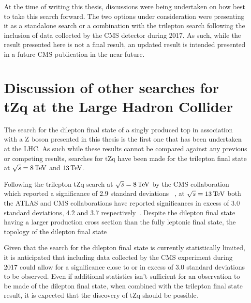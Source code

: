 At the time of writing this thesis, discussions were being undertaken on how best to take this search forward.
The two options under consideration were presenting it as a standalone search or a combination with the trilepton search following the inclusion of data collected by the CMS detector during 2017.
As such, while the result presented here is not a final result, an updated result is intended presented in a future CMS publication in the near future.

\section{Discussion of other searches for tZq at the Large Hadron Collider}
The search for the dilepton final state of a singly produced top in association with a Z boson presented in this thesis is the first one that has been undertaken at the LHC.
As such while these results cannot be compared against any previous or competing results, searches for tZq have been made for the trilepton final state at $\sqrt{s} =  8 \,\text{Te\hspace{-.08em}V}$ and $13 \,\text{Te\hspace{-.08em}V}$.

Following the trilepton tZq search at $\sqrt{s} = 8 \,\text{Te\hspace{-.08em}V}$ by the CMS collaboration which reported a significance of 2.9 standard deviations ~\cite{Sirunyan:2017kkr}, at $\sqrt{s} = 13 \,\text{Te\hspace{-.08em}V}$ both the ATLAS and CMS collaborations  have reported significances in excess of 3.0 standard deviations, 4.2 and 3.7 respectively~\cite{Aaboud:2017ylb,Sirunyan:2017nbr}.
Despite the dilepton final state having a larger production cross section than the fully leptonic final state, the topology of the dilepton final state  

Given that the search for the dilepton final state is currently statistically limited, it is anticipated that including data collected by the CMS experiment during 2017 could allow for a significance close to or in excess of 3.0 standard deviations to be observed.
Even if additional statistics isn't sufficient for an observation to be made of the dilepton final state, when combined with the trilepton final state result, it is expected that the discovery of tZq should be possible.

